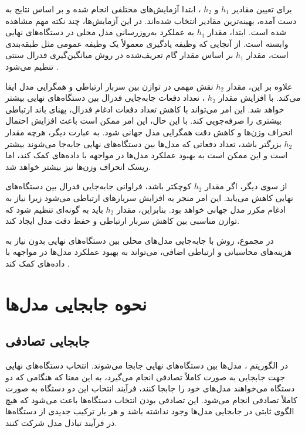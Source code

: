 برای تعیین مقادیر
$h_1$
و
$h_2$%
، ابتدا آزمایش‌های مختلفی انجام شده و بر اساس نتایج به دست آمده، بهینه‌ترین مقادیر انتخاب شده‌اند. در این آزمایش‌ها، چند نکته مهم مشاهده شده است. ابتدا، مقدار
$h_1$
به عملکرد به‌روزرسانی مدل محلی در دستگاه‌های نهایی وابسته است. از آنجایی که وظیفه یادگیری معمولاً یک وظیفه عمومی مثل طبقه‌بندی است، مقدار
$h_1$
بر اساس مقدار گام تعریف‌شده در روش میانگین‌گیری فدرال سنتی تنظیم می‌شود
\cite{chiu2020semisupervised}.

علاوه بر این، مقدار
$h_2$
نقش مهمی در توازن بین سربار ارتباطی و همگرایی مدل ایفا می‌کند. با افزایش مقدار
$h_2$%
، تعداد دفعات جابه‌جایی فدرال بین دستگاه‌های نهایی بیشتر خواهد شد. این امر می‌تواند با کاهش تعداد دفعات ادغام فدرال، پهنای باند ارتباطی بیشتری را صرفه‌جویی کند. با این حال، این امر ممکن است باعث افزایش احتمال انحراف وزن‌ها و کاهش دقت همگرایی مدل جهانی شود. به عبارت دیگر، هرچه مقدار
$h_2$
بزرگتر باشد، تعداد دفعاتی که مدل‌ها بین دستگاه‌های نهایی جابه‌جا می‌شوند بیشتر است و این ممکن است به بهبود عملکرد مدل‌ها در مواجهه با داده‌های
کمک کند، اما ریسک انحراف وزن‌ها نیز بیشتر خواهد شد.

از سوی دیگر، اگر مقدار
$h_2$
کوچکتر باشد، فراوانی جابه‌جایی فدرال بین دستگاه‌های نهایی کاهش می‌یابد. این امر منجر به افزایش سربارهای ارتباطی می‌شود زیرا نیاز به ادغام مکرر مدل جهانی خواهد بود. بنابراین، مقدار
$h_2$
باید به گونه‌ای تنظیم شود که توازن مناسبی بین کاهش سربار ارتباطی و حفظ دقت مدل ایجاد کند.

در مجموع، روش
با جابه‌جایی مدل‌های محلی بین دستگاه‌های نهایی بدون نیاز به هزینه‌های محاسباتی و ارتباطی اضافی، می‌تواند به بهبود عملکرد مدل‌ها در مواجهه با داده‌های
کمک کند
\cite{chiu2020semisupervised}.



\section{نحوه جابجایی مدل‌ها}
\subsection{جابجایی تصادفی}
در الگوریتم
%
، مدل‌ها بین دستگاه‌های نهایی جابجا می‌شوند. انتخاب دستگاه‌های نهایی جهت جابجایی به صورت کاملاً تصادفی انجام می‌گیرد، به این معنا که هنگامی که دو دستگاه می‌خواهند مدل‌های خود را جابجا کنند، فرآیند انتخاب این دو دستگاه به صورت کاملاً تصادفی انجام می‌شود. این تصادفی بودن انتخاب دستگاه‌ها باعث می‌شود که هیچ الگوی ثابتی در جابجایی مدل‌ها وجود نداشته باشد و هر بار ترکیب جدیدی از دستگاه‌ها در فرآیند تبادل مدل شرکت کنند.

